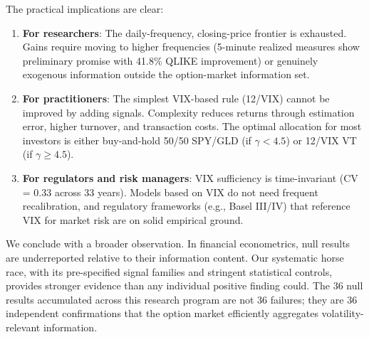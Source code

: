 \documentclass[12pt,a4paper]{article}
\begin{document}
The practical implications are clear:

\begin{enumerate}
    \item \textbf{For researchers}: The daily-frequency, closing-price frontier is exhausted. Gains require moving to higher frequencies (5-minute realized measures show preliminary promise with 41.8\% QLIKE improvement) or genuinely exogenous information outside the option-market information set.

    \item \textbf{For practitioners}: The simplest VIX-based rule (12/VIX) cannot be improved by adding signals. Complexity reduces returns through estimation error, higher turnover, and transaction costs. The optimal allocation for most investors is either buy-and-hold 50/50 SPY/GLD (if $\gamma < 4.5$) or 12/VIX VT (if $\gamma \geq 4.5$).

    \item \textbf{For regulators and risk managers}: VIX sufficiency is time-invariant (CV = 0.33 across 33 years). Models based on VIX do not need frequent recalibration, and regulatory frameworks (e.g., Basel III/IV) that reference VIX for market risk are on solid empirical ground.
\end{enumerate}

We conclude with a broader observation. In financial econometrics, null results are underreported relative to their information content. Our systematic horse race, with its pre-specified signal families and stringent statistical controls, provides stronger evidence than any individual positive finding could. The 36 null results accumulated across this research program are not 36 failures; they are 36 independent confirmations that the option market efficiently aggregates volatility-relevant information.


\end{document}
